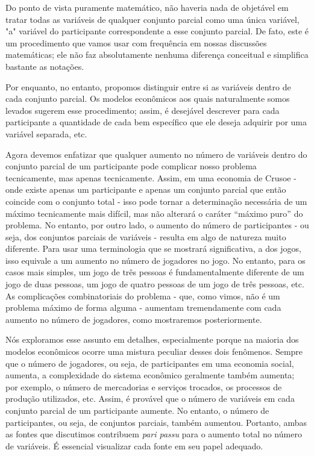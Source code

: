 \documentclass[a4paper,12pt]{article}[abntex2]
\begin{document}
Do ponto de vista puramente matemático, não haveria nada de objetável em tratar todas as variáveis de qualquer conjunto parcial como uma única variável, "a" variável do participante correspondente a esse conjunto parcial. De fato, este é um procedimento que vamos usar com frequência em nossas discussões matemáticas; ele não faz absolutamente nenhuma diferença conceitual e simplifica bastante as notações.

Por enquanto, no entanto, propomos distinguir entre si as variáveis dentro de cada conjunto parcial. Os modelos econômicos aos quais naturalmente somos levados sugerem esse procedimento; assim, é desejável descrever para cada participante a quantidade de cada bem específico que ele deseja adquirir por uma variável separada, etc.

Agora devemos enfatizar que qualquer aumento no número de variáveis dentro do conjunto parcial de um participante pode complicar nosso problema tecnicamente, mas apenas tecnicamente. Assim, em uma economia de Crusoe - onde existe apenas um participante e apenas um conjunto parcial que então coincide com o conjunto total - isso pode tornar a determinação necessária de um máximo tecnicamente mais difícil, mas não alterará o caráter “máximo puro” do problema. No entanto, por outro lado, o aumento do número de participantes - ou seja, dos conjuntos parciais de variáveis - resulta em algo de natureza muito diferente. Para usar uma terminologia que se mostrará significativa, a dos jogos, isso equivale a um aumento no número de jogadores no jogo. No entanto, para os casos mais simples, um jogo de três pessoas é fundamentalmente diferente de um jogo de duas pessoas, um jogo de quatro pessoas de um jogo de três pessoas, etc. As complicações combinatoriais do problema - que, como vimos, não é um problema máximo de forma alguma - aumentam tremendamente com cada aumento no número de jogadores, como mostraremos posteriormente.

Nós exploramos esse assunto em detalhes, especialmente porque na maioria dos modelos econômicos ocorre uma mistura peculiar desses dois fenômenos. Sempre que o número de jogadores, ou seja, de participantes em uma economia social, aumenta, a complexidade do sistema econômico geralmente também aumenta; por exemplo, o número de mercadorias e serviços trocados, os processos de produção utilizados, etc. Assim, é provável que o número de variáveis em cada conjunto parcial de um participante aumente. No entanto, o número de participantes, ou seja, de conjuntos parciais, também aumentou. Portanto, ambas as fontes que discutimos contribuem \textit{pari passu} para o aumento total no número de variáveis. É essencial visualizar cada fonte em seu papel adequado.
\end{document}
